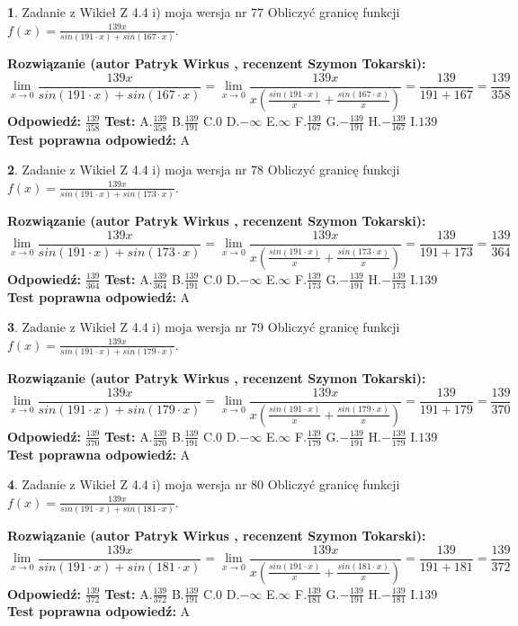\documentclass[12pt, a4paper]{article}
\theoremstyle{definition} %
\newtheorem{zad}{}
\newcommand{\zadStart}[1]{\begin{zad}#1\newline}
\newcommand{\zadStop}{\end{zad}}
\newcommand{\rozwStart}[2]{\noindent \textbf{Rozwiązanie (autor #1 , recenzent #2): }\newline}
\newcommand{\rozwStop}{\newline}
\newcommand{\odpStart}{\noindent \textbf{Odpowiedź:}\newline}
\newcommand{\odpStop}{\newline}
\newcommand{\testStart}{\noindent \textbf{Test:}\newline}
\newcommand{\testStop}{\newline}
\newcommand{\kluczStart}{\noindent \textbf{Test poprawna odpowiedź:}\newline}
\newcommand{\kluczStop}{\newline}
\begin{document}
\zadStart{Zadanie z Wikieł Z 4.4 i) moja wersja nr 77}
Obliczyć granicę funkcji $f(x)=\frac{139x}{sin(191\cdot x) +sin(167\cdot x)}$.
\zadStop
\rozwStart{Patryk Wirkus}{Szymon Tokarski}
$$\lim\limits_{x\to 0}\frac{139x}{sin(191\cdot x) +sin(167\cdot x)}=\lim\limits_{x\to 0}\frac{139x}{x(\frac{sin(191\cdot x)}{x}+\frac{sin(167\cdot x)}{x})}=\frac{139}{191+167} = \frac{139}{358}$$
\rozwStop
\odpStart
$\frac{139}{358}$
\odpStop
\testStart
A.$\frac{139}{358}$
B.$\frac{139}{191}$
C.$0$
D.$-\infty$
E.$\infty$
F.$\frac{139}{167}$
G.$-\frac{139}{191}$
H.$-\frac{139}{167}$
I.$139$
\testStop
\kluczStart
A
\kluczStop



\zadStart{Zadanie z Wikieł Z 4.4 i) moja wersja nr 78}
Obliczyć granicę funkcji $f(x)=\frac{139x}{sin(191\cdot x) +sin(173\cdot x)}$.
\zadStop
\rozwStart{Patryk Wirkus}{Szymon Tokarski}
$$\lim\limits_{x\to 0}\frac{139x}{sin(191\cdot x) +sin(173\cdot x)}=\lim\limits_{x\to 0}\frac{139x}{x(\frac{sin(191\cdot x)}{x}+\frac{sin(173\cdot x)}{x})}=\frac{139}{191+173} = \frac{139}{364}$$
\rozwStop
\odpStart
$\frac{139}{364}$
\odpStop
\testStart
A.$\frac{139}{364}$
B.$\frac{139}{191}$
C.$0$
D.$-\infty$
E.$\infty$
F.$\frac{139}{173}$
G.$-\frac{139}{191}$
H.$-\frac{139}{173}$
I.$139$
\testStop
\kluczStart
A
\kluczStop



\zadStart{Zadanie z Wikieł Z 4.4 i) moja wersja nr 79}
Obliczyć granicę funkcji $f(x)=\frac{139x}{sin(191\cdot x) +sin(179\cdot x)}$.
\zadStop
\rozwStart{Patryk Wirkus}{Szymon Tokarski}
$$\lim\limits_{x\to 0}\frac{139x}{sin(191\cdot x) +sin(179\cdot x)}=\lim\limits_{x\to 0}\frac{139x}{x(\frac{sin(191\cdot x)}{x}+\frac{sin(179\cdot x)}{x})}=\frac{139}{191+179} = \frac{139}{370}$$
\rozwStop
\odpStart
$\frac{139}{370}$
\odpStop
\testStart
A.$\frac{139}{370}$
B.$\frac{139}{191}$
C.$0$
D.$-\infty$
E.$\infty$
F.$\frac{139}{179}$
G.$-\frac{139}{191}$
H.$-\frac{139}{179}$
I.$139$
\testStop
\kluczStart
A
\kluczStop



\zadStart{Zadanie z Wikieł Z 4.4 i) moja wersja nr 80}
Obliczyć granicę funkcji $f(x)=\frac{139x}{sin(191\cdot x) +sin(181\cdot x)}$.
\zadStop
\rozwStart{Patryk Wirkus}{Szymon Tokarski}
$$\lim\limits_{x\to 0}\frac{139x}{sin(191\cdot x) +sin(181\cdot x)}=\lim\limits_{x\to 0}\frac{139x}{x(\frac{sin(191\cdot x)}{x}+\frac{sin(181\cdot x)}{x})}=\frac{139}{191+181} = \frac{139}{372}$$
\rozwStop
\odpStart
$\frac{139}{372}$
\odpStop
\testStart
A.$\frac{139}{372}$
B.$\frac{139}{191}$
C.$0$
D.$-\infty$
E.$\infty$
F.$\frac{139}{181}$
G.$-\frac{139}{191}$
H.$-\frac{139}{181}$
I.$139$
\testStop
\kluczStart
A
\kluczStop
\end{document}
